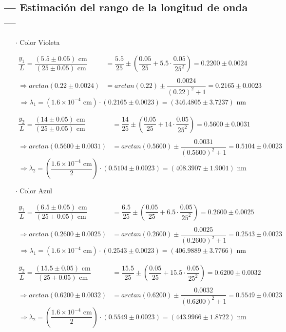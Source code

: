 \documentclass[12pt,a4paper]{article}
\begin{document}
 	\newpage
 	\subsection{--- Estimación del rango de la longitud de onda ---}
 	
 	\begin{itemize}
 		\item [$\cdot$] Color Violeta
 		
 		\begin{align*}
 			\dfrac{y_1}{L}=\dfrac{(5.5\pm 0.05)\mbox{ cm}}{(25\pm 0.05)\mbox{ cm}}&=
 			\dfrac{5.5}{25}\pm\left(\dfrac{0.05}{25}+5.5\cdot\dfrac{0.05}{25^2}\right)=
 			0.2200\pm0.0024 \\\\
 			\Longrightarrow arctan(0.22\pm0.0024)&=
 			arctan(0.22)\pm\dfrac{0.0024}{(0.22)^2+1}=
 			0.2165\pm 0.0023
 		\end{align*}
 		$$\Longrightarrow \lambda_1=
 		(1.6\times 10^{-4}\mbox{ cm})\cdot
 		(0.2165\pm 0.0023)=(346.4805\pm 3.7237)\mbox{ nm}$$
 		
 		\begin{align*}
 			\dfrac{y_2}{L}=\dfrac{(14\pm 0.05)\mbox{ cm}}{(25\pm 0.05)\mbox{ cm}}&=
 			\dfrac{14}{25}\pm\left(\dfrac{0.05}{25}+14\cdot\dfrac{0.05}{25^2}\right)=
 			0.5600\pm0.0031 \\\\
 			\Longrightarrow arctan(0.5600\pm0.0031)&=
 			arctan(0.5600)\pm\dfrac{0.0031}{(0.5600)^2+1}=
 			0.5104\pm 0.0023
 		\end{align*}
 		$$\Longrightarrow \lambda_2=
 		\left(\dfrac{1.6\times 10^{-4}\mbox{ cm}}{2}\right)\cdot
 		(0.5104\pm 0.0023 )=(408.3907\pm1.9001 )\mbox{ nm}$$
 		
 		
 		\item [$\cdot$] Color Azul
 		
 		\begin{align*}
 			\dfrac{y_1}{L}=\dfrac{(6.5\pm 0.05)\mbox{ cm}}{(25\pm 0.05)\mbox{ cm}}&=
 			\dfrac{6.5}{25}\pm\left(\dfrac{0.05}{25}+6.5\cdot\dfrac{0.05}{25^2}\right)=
 			0.2600\pm0.0025 \\\\
 			\Longrightarrow arctan(0.2600\pm0.0025)&=
 			arctan(0.2600)\pm\dfrac{0.0025}{(0.2600)^2+1}=
 			0.2543\pm0.0023 
 		\end{align*}
 		$$\Longrightarrow \lambda_1=
 		(1.6\times 10^{-4}\mbox{ cm})\cdot
 		(0.2543\pm0.0023 )=(406.9889\pm3.7766)\mbox{ nm}$$
 		
 		\begin{align*}
 			\dfrac{y_2}{L}=\dfrac{(15.5\pm 0.05)\mbox{ cm}}{(25\pm 0.05)\mbox{ cm}}&=
 			\dfrac{15.5}{25}\pm\left(\dfrac{0.05}{25}+15.5\cdot\dfrac{0.05}{25^2}\right)=
 			0.6200\pm0.0032 \\\\
 			\Longrightarrow arctan(0.6200\pm0.0032)&=
 			arctan(0.6200)\pm\dfrac{0.0032}{(0.6200)^2+1}=
 			0.5549\pm 0.0023
 		\end{align*}
 		$$\Longrightarrow \lambda_2=
 		\left(\dfrac{1.6\times 10^{-4}\mbox{ cm}}{2}\right)\cdot
 		(0.5549\pm 0.0023 )=(443.9966\pm 1.8722)\mbox{ nm}$$
 		

\end{itemize}
\end{document}
